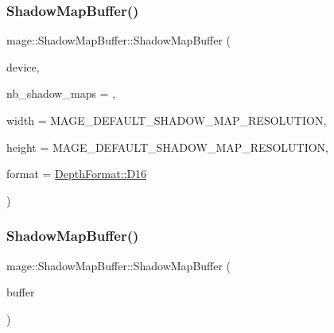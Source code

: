\subsubsection{\texorpdfstring{Shadow\+Map\+Buffer()}{ShadowMapBuffer()}\hspace{0.1cm}{\footnotesize\ttfamily [2/4]}}
{\footnotesize\ttfamily mage\+::\+Shadow\+Map\+Buffer\+::\+Shadow\+Map\+Buffer (\begin{DoxyParamCaption}\item[{I\+D3\+D11\+Device5 $\ast$}]{device,  }\item[{size\+\_\+t}]{nb\+\_\+shadow\+\_\+maps = {},  }\item[{\hyperlink{namespacemage_a41c104c036fba3756a74e19f793eeaa1}{U32}}]{width = {\ttfamily MAGE\+\_\+DEFAULT\+\_\+SHADOW\+\_\+MAP\+\_\+RESOLUTION},  }\item[{\hyperlink{namespacemage_a41c104c036fba3756a74e19f793eeaa1}{U32}}]{height = {\ttfamily MAGE\+\_\+DEFAULT\+\_\+SHADOW\+\_\+MAP\+\_\+RESOLUTION},  }\item[{\hyperlink{namespacemage_aed4c3f883a30484d0a20762c06be81d4}{Depth\+Format}}]{format = {\ttfamily \hyperlink{namespacemage_aed4c3f883a30484d0a20762c06be81d4a6fd9ec81643ee5a57f85a71951bfe13d}{Depth\+Format\+::\+D16}} }\end{DoxyParamCaption})\hspace{0.3cm}{\ttfamily [explicit]}}

\hypertarget{structmage_1_1_shadow_map_buffer_a276a32f787cda940ac36df461d0ce3ea}{}\label{structmage_1_1_shadow_map_buffer_a276a32f787cda940ac36df461d0ce3ea} 
\subsubsection{\texorpdfstring{Shadow\+Map\+Buffer()}{ShadowMapBuffer()}\hspace{0.1cm}{\footnotesize\ttfamily [3/4]}}
{\footnotesize\ttfamily mage\+::\+Shadow\+Map\+Buffer\+::\+Shadow\+Map\+Buffer (\begin{DoxyParamCaption}\item[{const \hyperlink{structmage_1_1_shadow_map_buffer}{Shadow\+Map\+Buffer} \&}]{buffer }\end{DoxyParamCaption})\hspace{0.3cm}{\ttfamily [delete]}}


